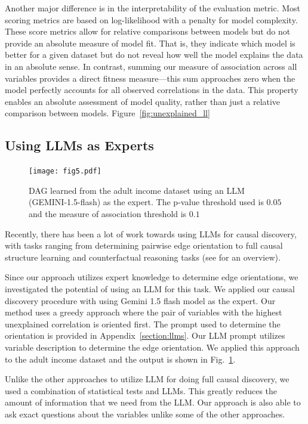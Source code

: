 \documentclass{uai2025} %
\begin{document}
Another major difference is in the interpretability of the evaluation metric.
Most scoring metrics are based on log-likelihood with a penalty for model
complexity. These score metrics allow for relative comparisons between models
but do not provide an absolute measure of model fit. That is, they indicate
which model is better for a given dataset but do not reveal how well the model
explains the data in an absolute sense. In contrast, summing our measure of
association across all variables provides a direct fitness measure—this sum
approaches zero when the model perfectly accounts for all observed correlations
in the data. This property enables an absolute assessment of model quality,
rather than just a relative comparison between models. Figure~\ref{fig:unexplained_ll}


\subsection{Using LLMs as Experts}
 
\begin{figure}[t!]
	\centering
	\texttt{[image: fig5.pdf]}
	\caption{DAG learned from the adult income dataset using an LLM (GEMINI-1.5-flash) as the expert. The p-value threshold used is $ 0.05 $ and the measure of association threshold is $ 0. 1 $}
	\label{fig:adult_llm}
\end{figure}
Recently, there has been a lot of work towards using LLMs for causal discovery,
with tasks ranging from determining pairwise edge orientation
\citep{Kiciman2023, Jin2024} to full causal structure learning \citep{Naik2023,
Vashishtha2023} and counterfactual reasoning tasks\citep{Kiciman2023} (see
\citet{Liu2024} for an overview).

Since our approach utilizes expert knowledge to determine edge orientations, we
investigated the potential of using an LLM for this task. We applied our causal
discovery procedure with using Gemini 1.5 flash model as the expert. Our method
uses a greedy approach where the pair of variables with the highest unexplained
correlation is oriented first. The prompt used to determine the orientation is
provided in Appendix~\ref{section:llms}. Our LLM prompt utilizes variable
description to determine the edge orientation. We applied this approach to the
adult income dataset and the output is shown in Fig.~\ref{fig:adult_llm}. 

Unlike the other approaches to utilize LLM for doing full causal discovery, we 
used a combination of statistical tests and LLMs. This greatly reduces the
amount of information that we need from the LLM. Our approach is also able to 
ask exact questions about the variables unlike some of the other approaches.
\end{document}
